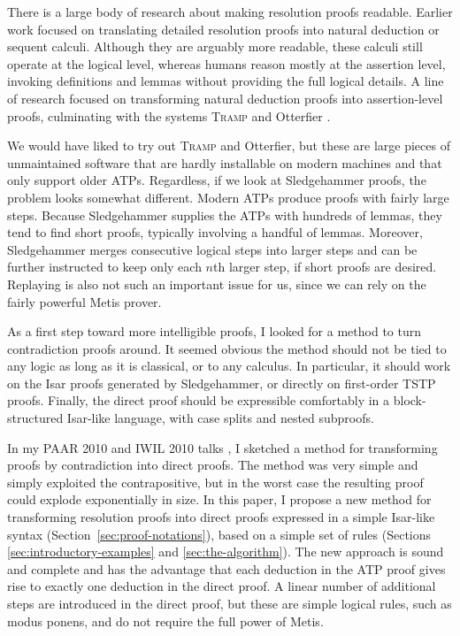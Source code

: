 \documentclass[withtimes,a4paper,12pt]{easychair}
\begin{document}
There is a large body of research about making resolution proofs
readable. Earlier work focused on translating detailed resolution
proofs into natural deduction or sequent calculi. %
Although they are arguably more readable, these calculi still operate
at the logical level, whereas humans reason mostly at the assertion
level, invoking definitions and lemmas without providing the full
logical details. %
A line of research focused on
transforming natural deduction proofs into assertion-level proofs,
culminating with the systems \textsc{Tramp} \cite{meier-2000} and Otterfier
\cite{zimmer-et-al-2004}.

We would have liked to try out \textsc{Tramp} and Otterfier, but these are large
pieces of unmaintained software that are hardly installable on modern machines
and that only support older ATPs. Regardless, if we look at Sledgehammer proofs,
the problem looks somewhat different. Modern ATPs produce proofs with fairly
large steps. Because Sledgehammer supplies the ATPs with hundreds of lemmas,
they tend to find short proofs, typically involving a handful of lemmas.
Moreover, Sledgehammer merges consecutive logical steps into larger steps and
can be further instructed to keep only each $n$th larger step, if short proofs
are desired. Replaying is also not such an important issue for us, since we can
rely on the fairly powerful Metis prover.

As a first step toward more intelligible proofs, I looked for a method to turn
contradiction proofs around. It seemed obvious the method should not be tied to
any logic as long as it is classical, or to any calculus. In particular, it
should work on the Isar proofs generated by Sledgehammer, or directly on
first-order TSTP proofs. Finally, the direct proof should be expressible
comfortably in a block-structured Isar-like language, with case splits and
nested subproofs.

In my PAAR 2010 and IWIL 2010 talks \cite{blanchette-paulson-2010,paulson-2010},
I sketched a method for transforming proofs by contradiction into direct proofs.
The method was very simple and simply exploited the contrapositive, but in the
worst case the resulting proof could explode exponentially in size. In this
paper, I propose a new method for transforming resolution proofs into direct
proofs expressed in a simple Isar-like syntax
(Section~\ref{sec:proof-notations}), based on a simple set of rules (Sections
\ref{sec:introductory-examples} and \ref{sec:the-algorithm}). The new approach
is sound and complete and has the advantage that each deduction in the ATP proof
gives rise to exactly one deduction in the direct proof. A linear number of
additional steps are introduced in the direct proof, but these are simple
logical rules, such as modus ponens, and do not require the full power of Metis.
\end{document}
